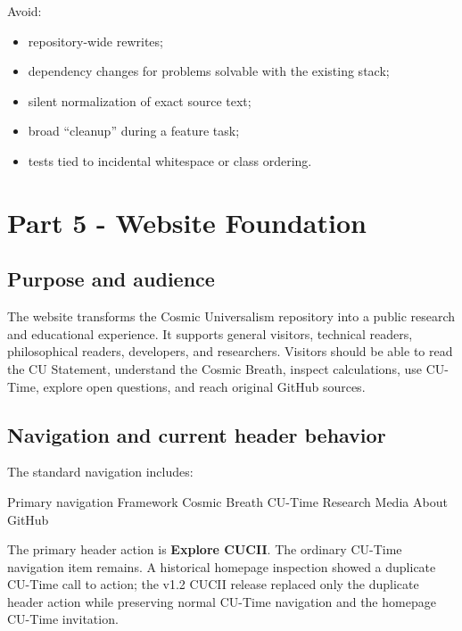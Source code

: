 \documentclass[11pt,letterpaper]{article}
\newcommand{\term}[1]{\textbf{\textsf{#1}}}
\begin{document}
Avoid:

\begin{itemize}
    \item repository-wide rewrites;
    \item dependency changes for problems solvable with the existing stack;
    \item silent normalization of exact source text;
    \item broad ``cleanup'' during a feature task;
    \item tests tied to incidental whitespace or class ordering.
\end{itemize}

\section{Part 5 - Website Foundation}

\subsection{Purpose and audience}

The website transforms the Cosmic Universalism repository into a public
research and educational experience. It supports general visitors, technical
readers, philosophical readers, developers, and researchers. Visitors should
be able to read the CU Statement, understand the Cosmic Breath, inspect
calculations, use CU-Time, explore open questions, and reach original GitHub
sources.

\subsection{Navigation and current header behavior}

The standard navigation includes:

\begin{codebox}{Primary navigation}
Framework
Cosmic Breath
CU-Time
Research
Media
About
GitHub
\end{codebox}

The primary header action is \term{Explore CUCII}. The ordinary CU-Time
navigation item remains. A historical homepage inspection showed a duplicate
CU-Time call to action; the v1.2 CUCII release replaced only the duplicate
header action while preserving normal CU-Time navigation and the homepage
CU-Time invitation.
\end{document}
